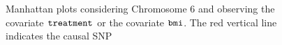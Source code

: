 \documentclass[10pt,a4paper]{article}
\begin{document}
\newpage

\begin{figure}[!htp]
\begin{center}
\caption{Manhattan plots considering Chromosome 6 and observing the covariate $\tt{treatment}$ or the covariate $\tt{bmi}$. The red vertical line indicates the causal SNP}
\label{plink-manhattan-plots}
\end{center}
\end{figure} 


\end{document}
